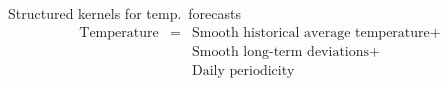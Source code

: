 %    
%
%    

\begin{frame}{Structured kernels for temp.\ forecasts}
  \begin{eqnarray*}
    \textrm{Temperature} & = & \textrm{Smooth historical average temperature} +  \\
    & & \textrm{Smooth long-term deviations} + \\
    & & \textrm{Daily periodicity}
  \end{eqnarray*}
  \begin{center}
    
  \end{center}
\end{frame}

